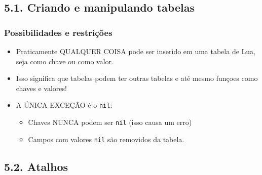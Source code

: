 \documentclass[brazil]{beamer}
\begin{document}
\subsection{5.1. Criando e manipulando tabelas}
\begin{frame}[fragile]
  \frametitle{Possibilidades e restrições}
  \begin{itemize}
    \pause
    \item Praticamente QUALQUER COISA pode ser inserido em uma
          tabela de Lua, seja como chave ou como valor.
    \pause
    \item Isso significa que tabelas podem ter outras tabelas e
          até mesmo funçoes como chaves e valores!
    \pause
    \item A ÚNICA EXCEÇÃO é o \verb$nil$:
    \begin{itemize}
      \pause
      \item Chaves NUNCA podem ser \verb$nil$ (isso causa um erro)
      \pause
      \item Campos com valores \verb$nil$ são removidos da tabela.
    \end{itemize}
  \end{itemize}
\end{frame}
\subsection{5.2. Atalhos}
\end{document}
